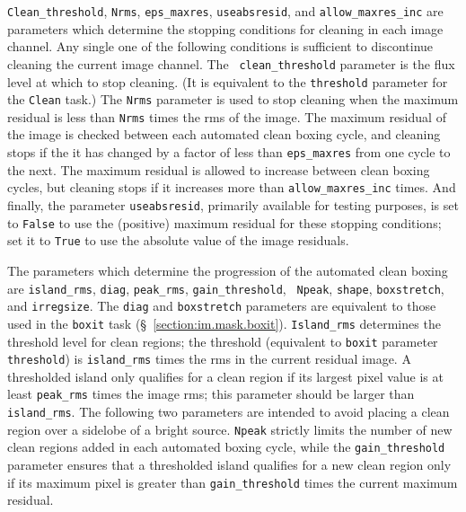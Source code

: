 {\tt Clean_threshold}, {\tt Nrms}, {\tt eps_maxres}, {\tt useabsresid}, and
{\tt allow_maxres_inc} are parameters which determine the stopping conditions
for cleaning in each image channel.  Any single one of the following conditions
is sufficient to discontinue cleaning the current image channel.  The {\tt
clean_threshold} parameter is the flux level at which to stop cleaning.  (It is
equivalent to the {\tt threshold} parameter for the {\tt Clean} task.)  The
{\tt Nrms} parameter is used to stop cleaning when the maximum residual is less
than {\tt Nrms} times the rms of the image.  The maximum residual of the image
is checked between each automated clean boxing cycle, and cleaning stops if the
it has changed by a factor of less than {\tt eps_maxres} from one cycle to the
next.  The maximum residual is allowed to increase between clean boxing cycles,
but cleaning stops if it increases more than {\tt allow_maxres_inc} times.
And finally, the parameter {\tt useabsresid}, primarily available for testing
purposes, is set to {\tt False} to use the (positive) maximum residual
for these stopping conditions; set it to {\tt True} to use the absolute value
of the image residuals.

The parameters which determine the progression of the automated clean boxing
are {\tt island_rms}, {\tt diag}, {\tt peak_rms}, {\tt gain_threshold}, {\tt
Npeak}, {\tt shape}, {\tt boxstretch}, and {\tt irregsize}.  The {\tt diag} and
{\tt boxstretch} parameters are equivalent to those used in the {\tt boxit}
task (\S~\ref{section:im.mask.boxit}).  {\tt Island_rms} determines the
threshold level for clean regions; the threshold (equivalent to {\tt boxit}
parameter {\tt threshold}) is {\tt island_rms} times the rms in the current
residual image.  A thresholded island only qualifies for a clean region if its
largest pixel value is at least {\tt peak_rms} times the image rms; this
parameter should be larger than {\tt island_rms}.  The following two parameters
are intended to avoid placing a clean region over a sidelobe of a bright
source.  {\tt Npeak} strictly limits the number of new clean regions added in
each automated boxing cycle, while the {\tt gain_threshold} parameter ensures
that a thresholded island qualifies for a new clean region only if its maximum
pixel is greater than {\tt gain_threshold} times the current maximum residual.

